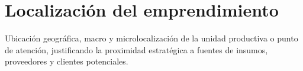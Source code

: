 \section{Localización del emprendimiento}
\label{sec:localizacion}

Ubicación geográfica, macro y microlocalización de la unidad productiva o punto de atención, justificando la proximidad estratégica a fuentes de insumos, proveedores y clientes potenciales.
